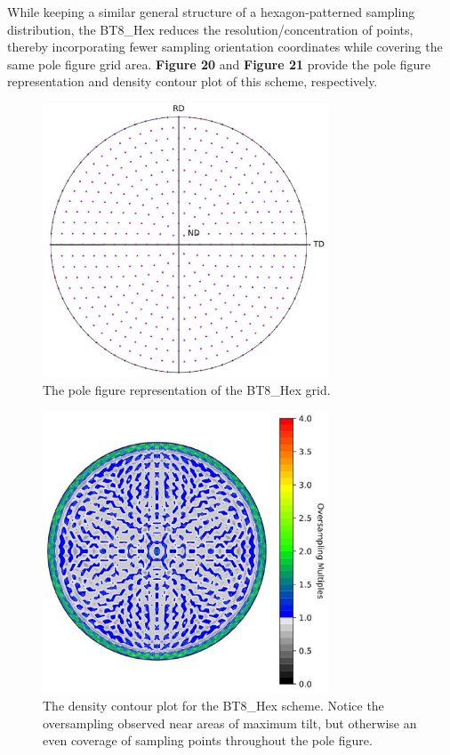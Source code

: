 \documentclass[10pt]{article}
\begin{document}
While keeping a similar general structure of a hexagon-patterned sampling
distribution, the BT8\_Hex reduces the resolution/concentration of points, thereby incorporating fewer sampling orientation coordinates
while covering the same pole figure grid area. \textbf{Figure 20} and \textbf{Figure 21} provide the pole figure representation and density
contour plot of this scheme, respectively.

\begin{figure}[h]
    \centering
    \includegraphics[width=8.5cm]{fig20}
    \caption{\label{tab1}The pole figure representation of the BT8\_Hex grid.} 
    \end{figure}

\begin{figure}[h]
    \centering
    \includegraphics[width=8.5cm]{fig21}
    \caption{\label{tab1}The density contour plot for the BT8\_Hex scheme. Notice the oversampling observed near areas of maximum tilt, 
    but otherwise an even coverage of sampling points throughout the pole figure.} 
    \end{figure}
\end{document}
